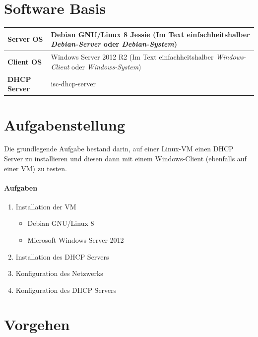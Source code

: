 \documentclass[12pt,a4paper,twoside,titlepage]{article}
\title{\titleText}
\author{\authorText}
\date{\dateText}
\begin{document}
	\maketitle
	\tableofcontents

        \section{Software Basis}

        \begin{tabular}{|l|p{7cm}|}
          \hline
          \textbf{Server OS} & Debian GNU/Linux 8 Jessie (Im Text einfachheitshalber \textit{Debian-Server} oder \textit{Debian-System})\\\hline
          \textbf{Client OS} & Windows Server 2012 R2 (Im Text einfachheitshalber \textit{Windows-Client} oder \textit{Windows-System}) \\\hline
          \textbf{DHCP Server} & isc-dhcp-server \\\hline
        \end{tabular}

        \section{Aufgabenstellung}

        Die grundlegende Aufgabe bestand darin, auf einer Linux-VM einen DHCP Server zu installieren und diesen dann mit einem Windows-Client (ebenfalls auf einer VM) zu testen.

        \paragraph{Aufgaben}
        \begin{enumerate}
        \item Installation der VM
          \begin{itemize}
          \item Debian GNU/Linux 8
          \item Microsoft Windows Server 2012
          \end{itemize}
        \item Installation des DHCP Servers
        \item Konfiguration des Netzwerks
        \item Konfiguration des DHCP Servers
        \end{enumerate}

        \section{Vorgehen}
\end{document}
